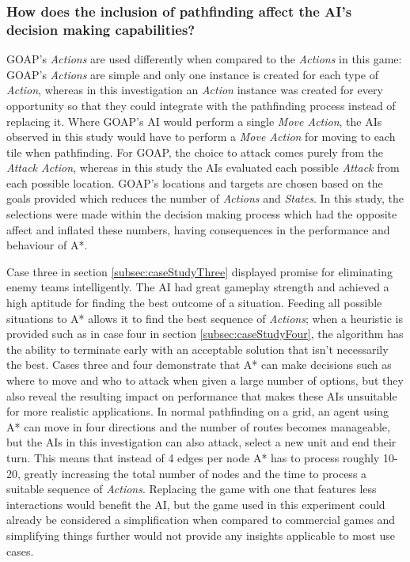 \documentclass[11pt, a4paper]{report}
\begin{document}
\subsubsection{How does the inclusion of pathfinding affect the AI's decision making capabilities?}

GOAP's \emph{Actions} are used differently when compared to the \emph{Actions} in this game: GOAP's \emph{Actions} are simple and only one instance is created for each type of \emph{Action}, whereas in this investigation an \emph{Action} instance was created for every opportunity so that they could integrate with the pathfinding process instead of replacing it. Where GOAP's AI would perform a single \emph{Move Action}, the AIs observed in this study would have to perform a \emph{Move Action} for moving to each tile when pathfinding. For GOAP, the choice to attack comes purely from the \emph{Attack Action}, whereas in this study the AIs evaluated each possible \emph{Attack} from each possible location. GOAP's locations and targets are chosen based on the goals provided which reduces the number of \emph{Actions} and \emph{States}. In this study, the selections were made within the decision making process which had the opposite affect and inflated these numbers, having consequences in the performance and behaviour of A*.

Case three in section \ref{subsec:caseStudyThree} displayed promise for eliminating enemy teams intelligently. The AI had great gameplay strength and achieved a high aptitude for finding the best outcome of a situation. Feeding all possible situations to A* allows it to find the best sequence of \emph{Actions}; when a heuristic is provided such as in case four in section \ref{subsec:caseStudyFour}, the algorithm has the ability to terminate early with an acceptable solution that isn't necessarily the best. Cases three and four demonstrate that A* can make decisions such as where to move and who to attack when given a large number of options, but they also reveal the resulting impact on performance that makes these AIs unsuitable for more realistic applications. In normal pathfinding on a grid, an agent using A* can move in four directions and the number of routes becomes manageable, but the AIs in this investigation can also attack, select a new unit and end their turn. This means that instead of 4 edges per node A* has to process roughly 10-20, greatly increasing the total number of nodes and the time to process a suitable sequence of \emph{Actions}. Replacing the game with one that features less interactions would benefit the AI, but the game used in this experiment could already be considered a simplification when compared to commercial games and simplifying things further would not provide any insights applicable to most use cases.
\end{document}
